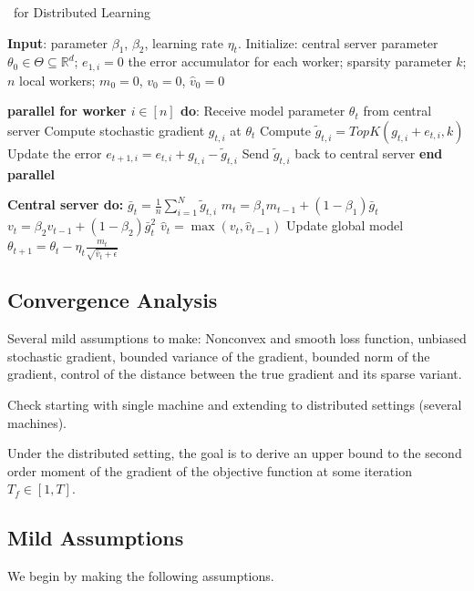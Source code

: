 \documentclass[11pt]{article}
\begin{document}
\begin{algorithm}[H]
\caption{\algo\ for Distributed Learning} \label{alg:sparsams}
\begin{algorithmic}[1]

\STATE \textbf{Input}: parameter $\beta_1$, $\beta_2$, learning rate $\eta_t$. 
\STATE Initialize: central server parameter $\theta_{0} \in \Theta \subseteq \mathbb R^d$; $e_{1,i}=0$ the error accumulator for each worker; sparsity parameter $k$; $n$ local workers; $m_0=0$, $v_0=0$, $\hat v_0=0$


\STATE\textbf{parallel for worker $i \in [n]$ do}:
\STATE\quad  Receive model parameter $\theta_{t}$ from central server
\STATE\quad  Compute stochastic gradient $g_{t,i}$ at $\theta_t$
\STATE\quad  Compute $\tilde g_{t,i}=TopK(g_{t,i}+e_{t,i},k)$ \label{line:topk} 
\STATE\quad  Update the error $e_{t+1,i}=e_{t,i}+g_{t,i}-\tilde g_{t,i}$
\STATE\quad  Send $\tilde g_{t,i}$ back to central server
\STATE \textbf{end parallel}

\STATE \textbf{Central server do:}
\STATE $\bar g_{t}=\frac{1}{n}\sum_{i=1}^N \tilde g_{t,i}$
\STATE $m_t=\beta_1 m_{t-1}+(1-\beta_1)\bar g_t$
\STATE $v_t=\beta_2 v_{t-1}+(1-\beta_2)\bar g_t^2$
\STATE $\hat v_t=\max(v_t,\hat v_{t-1})$ \label{line:v}
\STATE Update global model $\theta_{t+1}=\theta_{t}-\eta_t\frac{m_t}{\sqrt{\hat v_t+\epsilon}}$

\ENDFOR
\end{algorithmic}
\end{algorithm}


\subsection{Convergence Analysis}

Several mild assumptions to make: Nonconvex and smooth loss function, unbiased stochastic gradient, bounded variance of the gradient, bounded norm of the gradient, control of the distance between the true gradient and its sparse variant.

Check \citep{chen2020quantized} starting with single machine  and extending to distributed settings (several machines).


Under the distributed setting, the goal is to derive an upper bound to the second order moment of the gradient of the objective function at some iteration $T_f \in [1, T]$.

\subsection{Mild Assumptions}
We begin by making the following assumptions.
\end{document}
